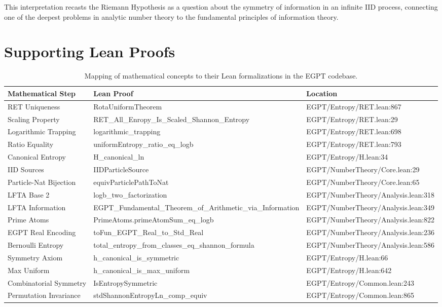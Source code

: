 \documentclass[12pt]{article}
\begin{document}
This interpretation recasts the Riemann Hypothesis as a question about the symmetry of information in an infinite IID process, connecting one of the deepest problems in analytic number theory to the fundamental principles of information theory.

\section*{Supporting Lean Proofs}

\begin{table}[h]
\centering
\begin{tabular}{|p{3cm}|p{4cm}|p{6cm}|}
\hline
\textbf{Mathematical Step} & \textbf{Lean Proof} & \textbf{Location} \\
\hline
RET Uniqueness & RotaUniformTheorem & EGPT/Entropy/RET.lean:867 \\
Scaling Property & RET\_All\_Enropy\_Is\_Scaled\_Shannon\_Entropy & EGPT/Entropy/RET.lean:29 \\
Logarithmic Trapping & logarithmic\_trapping & EGPT/Entropy/RET.lean:698 \\
Ratio Equality & uniformEntropy\_ratio\_eq\_logb & EGPT/Entropy/RET.lean:793 \\
Canonical Entropy & H\_canonical\_ln & EGPT/Entropy/H.lean:34 \\
IID Sources & IIDParticleSource & EGPT/NumberTheory/Core.lean:29 \\
Particle-Nat Bijection & equivParticlePathToNat & EGPT/NumberTheory/Core.lean:65 \\
LFTA Base 2 & logb\_two\_factorization & EGPT/NumberTheory/Analysis.lean:318 \\
LFTA Information & EGPT\_Fundamental\_Theorem\_of\_Arithmetic\_via\_Information & EGPT/NumberTheory/Analysis.lean:349 \\
Prime Atoms & PrimeAtoms.primeAtomSum\_eq\_logb & EGPT/NumberTheory/Analysis.lean:822 \\
EGPT Real Encoding & toFun\_EGPT\_Real\_to\_Std\_Real & EGPT/NumberTheory/Analysis.lean:236 \\
Bernoulli Entropy & total\_entropy\_from\_classes\_eq\_shannon\_formula & EGPT/NumberTheory/Analysis.lean:586 \\
Symmetry Axiom & h\_canonical\_is\_symmetric & EGPT/Entropy/H.lean:66 \\
Max Uniform & h\_canonical\_is\_max\_uniform & EGPT/Entropy/H.lean:642 \\
Combinatorial Symmetry & IsEntropySymmetric & EGPT/Entropy/Common.lean:243 \\
Permutation Invariance & stdShannonEntropyLn\_comp\_equiv & EGPT/Entropy/Common.lean:865 \\
\hline
\end{tabular}
\caption{Mapping of mathematical concepts to their Lean formalizations in the EGPT codebase.}
\end{table}
\end{document}
